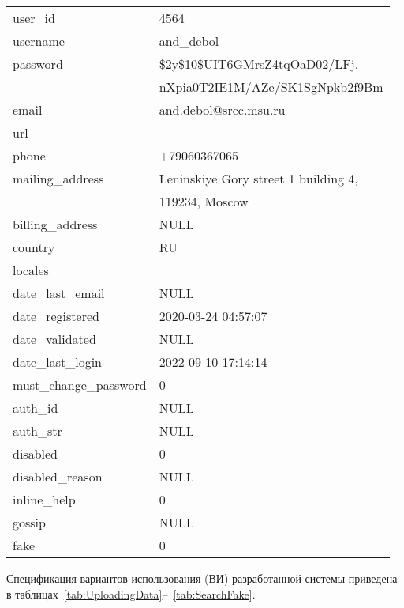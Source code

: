 \begin{longtable}{|l|l|}
    \hline
    user\_id & 4564 \\
    username & and\_debol \\
    password & \$2y\$10\$UIT6GMrsZ4tqOaD02/LFj. \\
    \newline & nXpia0T2IE1M/AZe/SK1SgNpkb2f9Bm \\
    email & and.debol@srcc.msu.ru \\
    url &  \\
    phone & +79060367065 \\
    mailing\_address & Leninskiye Gory street 1 building 4, \\
    \newline &  119234, Moscow \\
    billing\_address & NULL \\
    country & RU \\
    locales &  \\
    date\_last\_email & NULL \\
    date\_registered & 2020-03-24 04:57:07 \\
    date\_validated & NULL \\
    date\_last\_login & 2022-09-10 17:14:14 \\
    must\_change\_password & 0 \\
    auth\_id & NULL \\
    auth\_str & NULL \\
    disabled & 0 \\
    disabled\_reason & NULL \\
    inline\_help & 0 \\
    gossip & NULL \\
    fake & 0 \\
\end{longtable}



\newpage
{}


Спецификация вариантов использования (ВИ) разработанной системы приведена в таблицах~\ref{tab:UploadingData}--~\ref{tab:SearchFake}.


